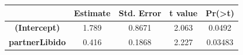 \documentclass[]{article}
\begin{document}
\begin{longtable}[]{@{}ccccc@{}}
\toprule
\begin{minipage}[b]{0.24\columnwidth}\centering\strut
~\strut
\end{minipage} & \begin{minipage}[b]{0.13\columnwidth}\centering\strut
Estimate\strut
\end{minipage} & \begin{minipage}[b]{0.16\columnwidth}\centering\strut
Std. Error\strut
\end{minipage} & \begin{minipage}[b]{0.12\columnwidth}\centering\strut
t value\strut
\end{minipage} & \begin{minipage}[b]{0.12\columnwidth}\centering\strut
Pr(\textgreater{}\textbar{}t\textbar{})\strut
\end{minipage}\tabularnewline
\midrule
\endhead
\begin{minipage}[t]{0.24\columnwidth}\centering\strut
\textbf{(Intercept)}\strut
\end{minipage} & \begin{minipage}[t]{0.13\columnwidth}\centering\strut
1.789\strut
\end{minipage} & \begin{minipage}[t]{0.16\columnwidth}\centering\strut
0.8671\strut
\end{minipage} & \begin{minipage}[t]{0.12\columnwidth}\centering\strut
2.063\strut
\end{minipage} & \begin{minipage}[t]{0.12\columnwidth}\centering\strut
0.0492\strut
\end{minipage}\tabularnewline
\begin{minipage}[t]{0.24\columnwidth}\centering\strut
\textbf{partnerLibido}\strut
\end{minipage} & \begin{minipage}[t]{0.13\columnwidth}\centering\strut
0.416\strut
\end{minipage} & \begin{minipage}[t]{0.16\columnwidth}\centering\strut
0.1868\strut
\end{minipage} & \begin{minipage}[t]{0.12\columnwidth}\centering\strut
2.227\strut
\end{minipage} & \begin{minipage}[t]{0.12\columnwidth}\centering\strut
0.03483\strut
\end{minipage}\tabularnewline

\end{longtable}
\end{document}
